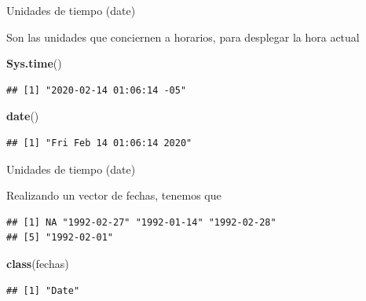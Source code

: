\documentclass[ignorenonframetext,]{beamer}
\newenvironment{Shaded}{\begin{snugshade}}{\end{snugshade}}
\newcommand{\KeywordTok}[1]{\textcolor[rgb]{0.13,0.29,0.53}{\textbf{#1}}}
\newcommand{\StringTok}[1]{\textcolor[rgb]{0.31,0.60,0.02}{#1}}
\newcommand{\NormalTok}[1]{#1}
\begin{document}
\begin{frame}[fragile]{Unidades de tiempo (date)}

Son las unidades que conciernen a horarios, para desplegar la hora
actual

\begin{Shaded}
\begin{Highlighting}[]
\KeywordTok{Sys.time}\NormalTok{()}
\end{Highlighting}
\end{Shaded}

\begin{verbatim}
## [1] "2020-02-14 01:06:14 -05"
\end{verbatim}

\begin{Shaded}
\begin{Highlighting}[]
\KeywordTok{date}\NormalTok{()}
\end{Highlighting}
\end{Shaded}

\begin{verbatim}
## [1] "Fri Feb 14 01:06:14 2020"
\end{verbatim}

\end{frame}

\begin{frame}[fragile]{Unidades de tiempo (date)}

Realizando un vector de fechas, tenemos que

\begin{Shaded}
\end{Shaded}

\begin{verbatim}
## [1] NA "1992-02-27" "1992-01-14" "1992-02-28" 
## [5] "1992-02-01"
\end{verbatim}

\begin{Shaded}
\begin{Highlighting}[]
\KeywordTok{class}\NormalTok{(fechas)}
\end{Highlighting}
\end{Shaded}

\begin{verbatim}
## [1] "Date"
\end{verbatim}

\end{frame}
\end{document}
